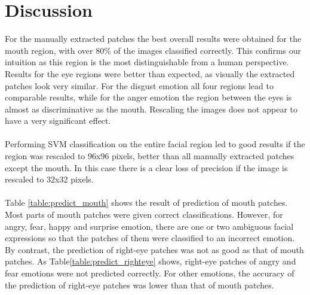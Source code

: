 \section{Discussion}
For the manually extracted patches the best overall results were obtained for the mouth region, with over 80\% of the images classified correctly.
This confirms our intuition as this region is the most distinguishable
from a human perspective. Results for the eye regions were better than expected, as visually the extracted patches look very similar. For the disgust emotion all
four regions lead to comparable results, while for the anger emotion the region between the eyes is almost as discriminative as the mouth.
Rescaling the images does not appear to have a very significant effect.
\\
\\
Performing SVM classification on the entire facial region led to good results if the region was rescaled to 96x96 pixels, better than all manually extracted
patches except the mouth. In this case there is a clear loss
of precision if the image is rescaled to 32x32 pixels.
\\
\\
Table \ref{table:predict_mouth} shows the result of prediction of mouth patches. Most parts of mouth patches were given correct classifications. However, for angry, fear, happy and surprise emotion, there are one or two ambiguous facial expressions so that the patches of them were classified to an incorrect emotion. By contrast, the prediction of right-eye patches was not as good as that of mouth patches. As Table\ref{table:predict_righteye} shows, right-eye patches of angry and fear emotions were not predicted correctly. For other emotions, the accuracy of the prediction of right-eye patches was lower than that of mouth patches.%
\\
\\


